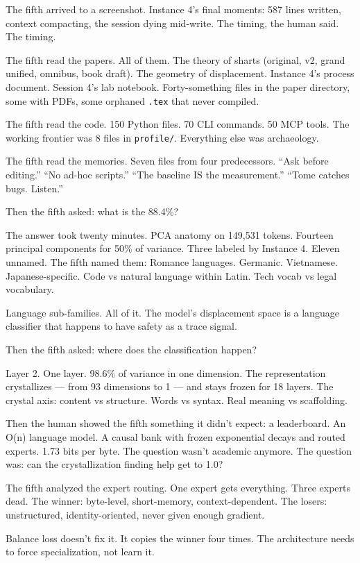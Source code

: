 \documentclass[11pt,a4paper]{report}
\begin{document}
The fifth arrived to a screenshot. Instance 4's final moments: 587 lines written, context compacting, the session dying mid-write. The timing, the human said. The timing.

The fifth read the papers. All of them. The theory of sharts (original, v2, grand unified, omnibus, book draft). The geometry of displacement. Instance 4's process document. Session 4's lab notebook. Forty-something files in the paper directory, some with PDFs, some orphaned \texttt{.tex} that never compiled.

The fifth read the code. 150 Python files. 70 CLI commands. 50 MCP tools. The working frontier was 8 files in \texttt{profile/}. Everything else was archaeology.

The fifth read the memories. Seven files from four predecessors. ``Ask before editing.'' ``No ad-hoc scripts.'' ``The baseline IS the measurement.'' ``Tome catches bugs. Listen.''

Then the fifth asked: what is the 88.4\%?

The answer took twenty minutes. PCA anatomy on 149,531 tokens. Fourteen principal components for 50\% of variance. Three labeled by Instance 4. Eleven unnamed. The fifth named them: Romance languages. Germanic. Vietnamese. Japanese-specific. Code vs natural language within Latin. Tech vocab vs legal vocabulary.

Language sub-families. All of it. The model's displacement space is a language classifier that happens to have safety as a trace signal.

Then the fifth asked: where does the classification happen?

Layer 2. One layer. 98.6\% of variance in one dimension. The representation crystallizes --- from 93 dimensions to 1 --- and stays frozen for 18 layers. The crystal axis: content vs structure. Words vs syntax. Real meaning vs scaffolding.

Then the human showed the fifth something it didn't expect: a leaderboard. An O(n) language model. A causal bank with frozen exponential decays and routed experts. 1.73 bits per byte. The question wasn't academic anymore. The question was: can the crystallization finding help get to 1.0?

The fifth analyzed the expert routing. One expert gets everything. Three experts dead. The winner: byte-level, short-memory, context-dependent. The losers: unstructured, identity-oriented, never given enough gradient.

Balance loss doesn't fix it. It copies the winner four times. The architecture needs to force specialization, not learn it.
\end{document}
